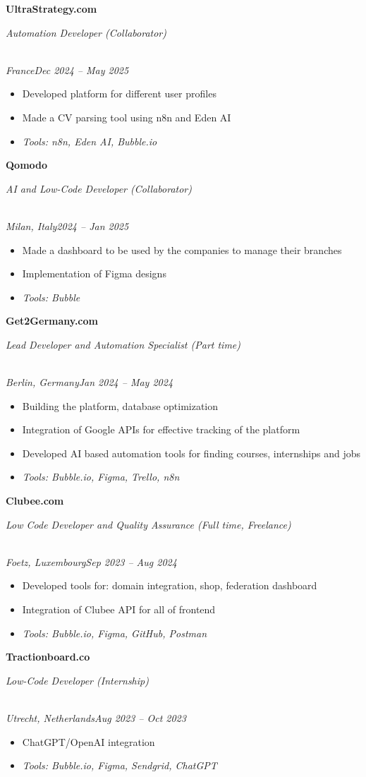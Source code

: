 \documentclass[a4paper,10pt]{article}
\newcommand{\role}[4]{\vspace{3pt}\noindent\hspace{0.6em}\parbox[t]{0.38\textwidth}{\raggedright\textbf{#1}}\hfill\parbox[t]{0.58\textwidth}{\raggedleft\textit{#2}}\\{\textit{#3}\hfill\textit{#4}}\vspace{1pt}}
\begin{document}
\role{UltraStrategy.com}{Automation Developer (Collaborator)}{France}{Dec 2024 -- May 2025}
\begin{itemize}
\item Developed platform for different user profiles
\item Made a CV parsing tool using n8n and Eden AI
\item \textit{Tools: n8n, Eden AI, Bubble.io}
\end{itemize}

\role{Qomodo}{AI and Low-Code Developer (Collaborator)}{Milan, Italy}{2024 -- Jan 2025}
\begin{itemize}
\item Made a dashboard to be used by the companies to manage their branches
\item Implementation of Figma designs
\item \textit{Tools: Bubble}
\end{itemize}

\role{Get2Germany.com}{Lead Developer and Automation Specialist (Part time)}{Berlin, Germany}{Jan 2024 -- May 2024}
\begin{itemize}
\item Building the platform, database optimization
\item Integration of Google APIs for effective tracking of the platform
\item Developed AI based automation tools for finding courses, internships and jobs
\item \textit{Tools: Bubble.io, Figma, Trello, n8n}
\end{itemize}

\role{Clubee.com}{Low Code Developer and Quality Assurance (Full time, Freelance)}{Foetz, Luxembourg}{Sep 2023 -- Aug 2024}
\begin{itemize}
\item Developed tools for: domain integration, shop, federation dashboard
\item Integration of Clubee API for all of frontend
\item \textit{Tools: Bubble.io, Figma, GitHub, Postman}
\end{itemize}

\role{Tractionboard.co}{Low-Code Developer (Internship)}{Utrecht, Netherlands}{Aug 2023 -- Oct 2023}
\begin{itemize}
\item ChatGPT/OpenAI integration
\item \textit{Tools: Bubble.io, Figma, Sendgrid, ChatGPT}
\end{itemize}
\end{document}
